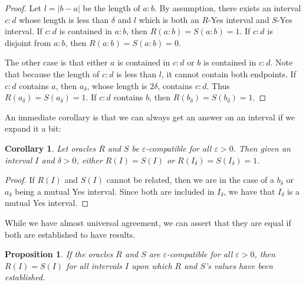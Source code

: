 \documentclass[12pt]{article}
\newtheorem{corollary}{Corollary}[subsection]
\newtheorem{proposition}{Proposition}[subsection]
\begin{document}
\begin{proof}
    Let $l=|b-a|$ be the length of $a:b$. By assumption, there exists an interval $c:d$ whose length is less than $\delta$ and $l$ which is both an $R$-Yes interval and $S$-Yes interval. If $c:d$ is contained in $a:b$, then $R(a:b)=S(a:b)=1$. If $c:d$ is  disjoint from $a:b$, then $R(a:b)=S(a:b)=0$.
    
    The other case is that either $a$ is contained in $c:d$ or $b$ is contained in $c:d$. Note that because the length of $c:d$ is less than $l$, it cannot contain both endpoints. If $c:d$ contains $a$, then $a_\delta$, whose length is $2 \delta$, contains $c:d$. Thus $R(a_\delta)=S(a_\delta) = 1$. If $c:d$ contains $b$, then $R(b_\delta)=S(b_\delta)=1$. 
\end{proof}

An immediate corollary is that we can always get an answer on an interval if we expand it a bit: 

\begin{corollary}
    Let oracles $R$ and $S$ be $\varepsilon$-compatible for all $\varepsilon >0$. Then given an interval $I$ and $\delta > 0$, either $R(I)=S(I)$ or $R(I_\delta)=S(I_\delta)=1$.
\end{corollary}

\begin{proof}
    If $R(I)$ and $S(I)$ cannot be related, then we are in the case of a $b_\delta$ or $a_\delta$ being a mutual Yes interval. Since both are included in $I_\delta$, we have that $I_\delta$ is a mutual Yes interval. 
\end{proof}

While we have almost universal agreement, we can assert that they are equal if both are established to have results. 

\begin{proposition}\label{pr:epsilon-compatible}
If the oracles $R$ and $S$ are $\varepsilon$-compatible for all $\varepsilon > 0$, then $R(I)=S(I)$ for all intervals $I$ upon which $R$ and $S$'s values have been established. 
\end{proposition}
\end{document}
